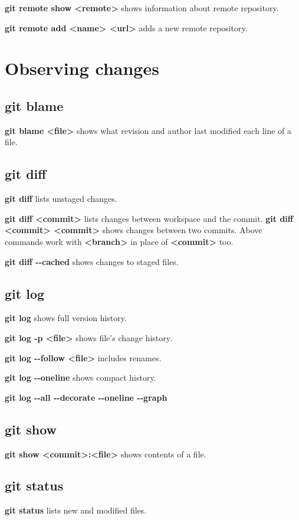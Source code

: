\documentclass[a4paper, twoside, 8pt]{extarticle}
\begin{document}
\begin{multicols*}{3}
\textbf{git remote show <remote>} shows information about remote repository.

\textbf{git remote add <name> <url>} adds a new remote repository.

\section*{Observing changes}
\subsection*{\dotfill git blame}
\textbf{git blame <file>} shows what revision and author last modified each line of a file.

\subsection*{\dotfill git diff} 
\textbf{git diff} lists unstaged changes.

\textbf{git diff <commit>} lists changes between workspace and the commit.
\textbf{git diff <commit> <commit>} shows changes between two commits.
Above commands work with \textbf{<branch>} in place of \textbf{<commit>} too.

\textbf{git diff -{}-cached} shows changes to staged files.

\subsection*{\dotfill git log}
\textbf{git log} shows full version history.

\textbf{git log -p <file>} shows file's change history.

\textbf{git log -{}-follow <file>} includes renames.

\textbf{git log -{}-oneline} shows compact history.

\textbf{git log -{}-all -{}-decorate -{}-oneline -{}-graph}

\subsection*{\dotfill git show}
\textbf{git show <commit>:<file>} shows contents of a file.

\subsection*{\dotfill git status}
\textbf{git status} lists new and modified files.


\end{multicols*}
\end{document}
